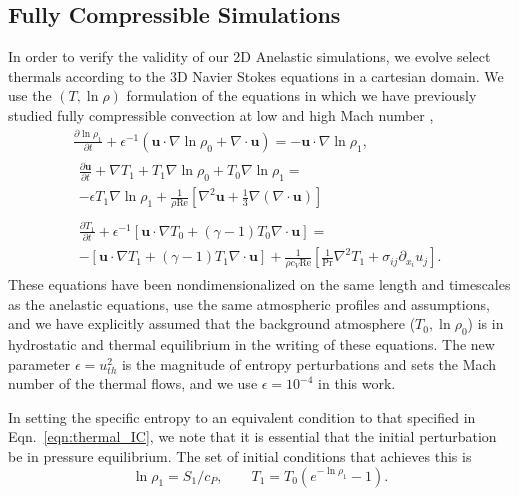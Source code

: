\documentclass[twocolumn, amsmath, amsfonts, amssymb, trackchanges]{aastex62}
\newcommand{\DivU}{\ensuremath{\nabla\cdot\bm{u}}}
\newcommand{\grad}{\ensuremath{\nabla}}
\begin{document}
\subsection{Fully Compressible Simulations}
In order to verify the validity of our 2D Anelastic simulations, we evolve select thermals according to the 3D Navier Stokes equations in a cartesian domain. 
We use the $(T, \ln\rho)$ formulation of the equations in which we have previously studied fully compressible convection at low and high Mach number \citep{lecoanet&all2014, anders&brown2017},
\begin{gather}
\frac{\partial \ln\rho_1}{\partial t} + \epsilon^{-1}\left(\bm{u}\cdot\grad\ln\rho_0 + \DivU\right) = -\bm{u}\cdot\grad\ln\rho_1, \\
\begin{split}
\frac{\partial \bm{u}}{\partial t}  +\grad T_1 + T_1\grad\ln\rho_0 + T_0\grad\ln\rho_1  =\\
- \epsilon T_1\grad\ln\rho_1 + \frac{1}{\rho\text{Re}}\left[\grad^2\bm{u} + \frac{1}{3}\grad(\DivU)\right]
\end{split} \\
\begin{split}
\frac{\partial T_1}{\partial t} + \epsilon^{-1}\left[\bm{u}\cdot\grad T_0 + (\gamma-1)T_0\DivU\right] = \\
-\left[\bm{u}\cdot\grad T_1 + (\gamma-1)T_1\DivU\right] + \frac{1}{\rho c_V\text{Re}}\left[\frac{1}{\text{Pr}}\grad^2 T_1 + \sigma_{ij}\partial_{x_i}u_j\right].
\end{split}
\end{gather}
These equations have been nondimensionalized on the same length and timescales as the anelastic equations, use the same atmospheric profiles and assumptions, and we have explicitly assumed that the background atmosphere ($T_0, \ln\rho_0$) is in hydrostatic and thermal equilibrium in the writing of these equations. 
The new parameter $\epsilon = u_{th}^2$ is the magnitude of entropy perturbations and sets the Mach number of the thermal flows, and we use $\epsilon = 10^{-4}$ in this work. 

In setting the specific entropy to an equivalent condition to that specified in Eqn.~\ref{eqn:thermal_IC}, we note that it is essential that the initial perturbation be in pressure equilibrium. 
The set of initial conditions that achieves this is
\begin{equation}
\ln\rho_1 = S_1/c_P, \qquad T_1 = T_0(e^{-\ln\rho_1} - 1).
\end{equation}
\end{document}
